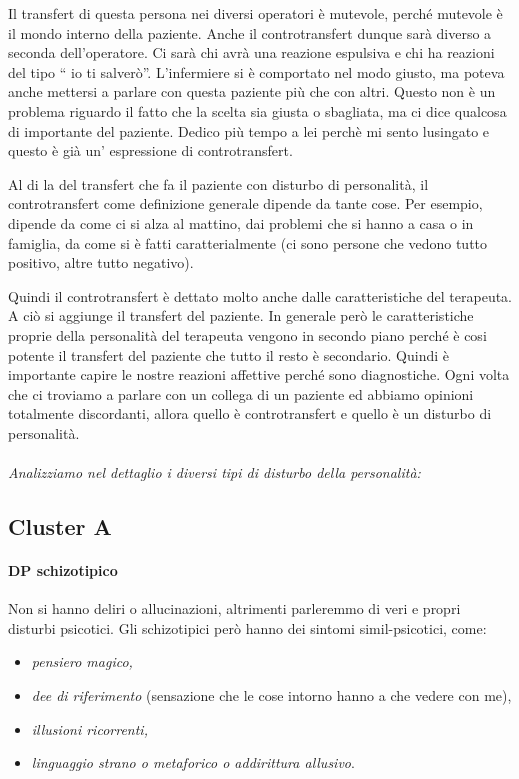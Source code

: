 Il transfert di questa persona nei diversi operatori è mutevole, perché
mutevole è il mondo interno della paziente. Anche il controtransfert
dunque sarà diverso a seconda dell'operatore. Ci sarà chi avrà una
reazione espulsiva e chi ha reazioni del tipo `` io ti salverò''.
L'infermiere si è comportato nel modo giusto, ma poteva anche mettersi a
parlare con questa paziente più che con altri. Questo non è un problema
riguardo il fatto che la scelta sia giusta o sbagliata, ma ci dice
qualcosa di importante del paziente. Dedico più tempo a lei perchè mi
sento lusingato e questo è già un' espressione di controtransfert.

Al di la del transfert che fa il paziente con disturbo di personalità,
il controtransfert come definizione generale dipende da tante cose. Per
esempio, dipende da come ci si alza al mattino, dai problemi che si
hanno a casa o in famiglia, da come si è fatti caratterialmente (ci sono
persone che vedono tutto positivo, altre tutto negativo).

Quindi il controtransfert è dettato molto anche dalle caratteristiche
del terapeuta. A ciò si aggiunge il transfert del paziente. In generale
però le caratteristiche proprie della personalità del terapeuta vengono
in secondo piano perché è cosi potente il transfert del paziente che
tutto il resto è secondario. Quindi è importante capire le nostre
reazioni affettive perché sono diagnostiche. Ogni volta che ci troviamo
a parlare con un collega di un paziente ed abbiamo opinioni totalmente
discordanti, allora quello è controtransfert e quello è un disturbo di
personalità.
\\\\
\emph{Analizziamo nel dettaglio i diversi tipi di disturbo della
personalità:}

\subsection{Cluster A}

\paragraph{DP schizotipico}

Non si hanno deliri o allucinazioni, altrimenti parleremmo di veri e
propri disturbi psicotici. Gli schizotipici però hanno dei sintomi
simil-psicotici, come:

\begin{itemize}
\item \emph{pensiero magico,}
\item \emph{dee di riferimento} (sensazione che le cose intorno hanno a che vedere con me),
\item \emph{illusioni ricorrenti,}
\item \emph{linguaggio strano o metaforico o addirittura allusivo}.
\end{itemize}


